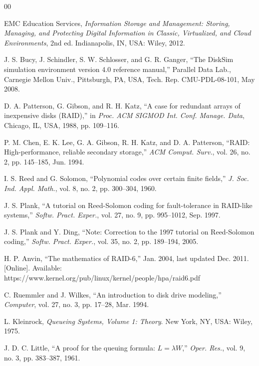 \documentclass{ieeeaccess}
\begin{document}
\begin{thebibliography}{00}

 EMC Education Services, \emph{Information Storage and Management: Storing, Managing, and Protecting Digital Information in Classic, Virtualized, and Cloud Environments}, 2nd ed. Indianapolis, IN, USA: Wiley, 2012.

 J. S. Bucy, J. Schindler, S. W. Schlosser, and G. R. Ganger, ``The DiskSim simulation environment version 4.0 reference manual,'' Parallel Data Lab., Carnegie Mellon Univ., Pittsburgh, PA, USA, Tech. Rep. CMU-PDL-08-101, May 2008.

 D. A. Patterson, G. Gibson, and R. H. Katz, ``A case for redundant arrays of inexpensive disks (RAID),'' in \emph{Proc. ACM SIGMOD Int. Conf. Manage. Data}, Chicago, IL, USA, 1988, pp. 109--116.

 P. M. Chen, E. K. Lee, G. A. Gibson, R. H. Katz, and D. A. Patterson, ``RAID: High-performance, reliable secondary storage,'' \emph{ACM Comput. Surv.}, vol. 26, no. 2, pp. 145--185, Jun. 1994.

 I. S. Reed and G. Solomon, ``Polynomial codes over certain finite fields,'' \emph{J. Soc. Ind. Appl. Math.}, vol. 8, no. 2, pp. 300--304, 1960.

 J. S. Plank, ``A tutorial on Reed-Solomon coding for fault-tolerance in RAID-like systems,'' \emph{Softw. Pract. Exper.}, vol. 27, no. 9, pp. 995--1012, Sep. 1997.

 J. S. Plank and Y. Ding, ``Note: Correction to the 1997 tutorial on Reed-Solomon coding,'' \emph{Softw. Pract. Exper.}, vol. 35, no. 2, pp. 189--194, 2005.

 H. P. Anvin, ``The mathematics of RAID-6,'' Jan. 2004, last updated Dec. 2011. [Online]. Available: https://www.kernel.org/pub/linux/kernel/people/hpa/raid6.pdf

 C. Ruemmler and J. Wilkes, ``An introduction to disk drive modeling,'' \emph{Computer}, vol. 27, no. 3, pp. 17--28, Mar. 1994.

 L. Kleinrock, \emph{Queueing Systems, Volume 1: Theory}. New York, NY, USA: Wiley, 1975.

 J. D. C. Little, ``A proof for the queuing formula: $L = \lambda W$,'' \emph{Oper. Res.}, vol. 9, no. 3, pp. 383--387, 1961.


\end{thebibliography}
\end{document}
